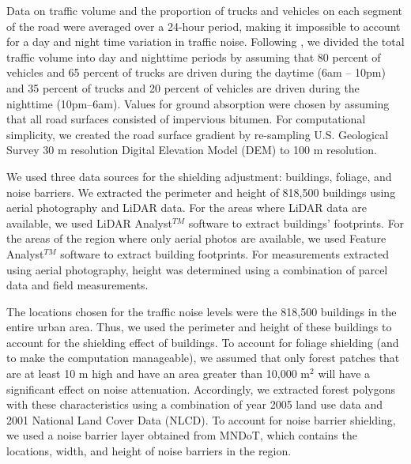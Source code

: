\documentclass{article}\usepackage{graphicx, color}
\begin{document}
Data on traffic volume and the proportion of trucks and vehicles on each segment of the road were averaged over a 24-hour period, making it impossible to account for a day and night time variation in traffic noise. Following \citet{Arditi2007}, we divided the total traffic volume into day and nighttime periods by assuming that 80 percent of vehicles and 65 percent of trucks are driven during the daytime (6am -- 10pm) and 35 percent of trucks and 20 percent of vehicles are driven during the nighttime (10pm--6am). Values for ground absorption were chosen by assuming that all road surfaces consisted of impervious bitumen. For computational simplicity, we created the road surface gradient by re-sampling U.S. Geological Survey 30 m resolution Digital Elevation Model (DEM) to 100 m resolution. 

We used three data sources for the shielding adjustment: buildings, foliage, and noise barriers. We extracted the perimeter and height of 818,500 buildings using aerial photography and LiDAR data. For the areas where LiDAR data are available, we used LiDAR Analyst$^{TM}$ software to extract buildings’ footprints. For the areas of the region where only aerial photos are available, we used Feature Analyst$^{TM}$ software to extract building footprints. For measurements extracted using aerial photography, height was determined using a combination of parcel data and field measurements. 

The locations chosen for the traffic noise levels were the 818,500 buildings in the entire urban area. Thus, we used the perimeter and height of these buildings to account for the shielding effect of buildings. To account for foliage shielding (and to make the computation manageable), we assumed that only forest patches that are at least 10 m high and have an area greater than 10,000 m$^2$ will have a significant effect on noise attenuation. Accordingly, we extracted forest polygons with these characteristics using a combination of year 2005 land use data and 2001 National Land Cover Data (NLCD). To account for noise barrier shielding, we used a noise barrier layer obtained from MNDoT, which contains the locations, width, and height of noise barriers in the region.
\end{document}
